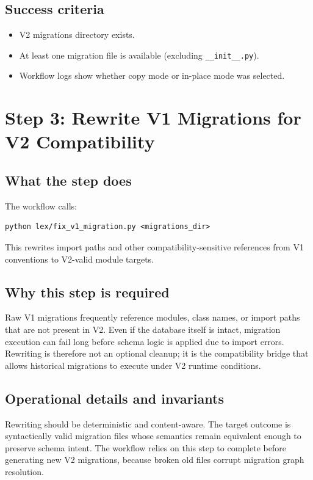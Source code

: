 \documentclass[11pt,a4paper]{article}
\begin{document}
\subsection*{Success criteria}
\begin{itemize}[leftmargin=1.5em]
  \item V2 migrations directory exists.
  \item At least one migration file is available (excluding \texttt{\_\_init\_\_.py}).
  \item Workflow logs show whether copy mode or in-place mode was selected.
\end{itemize}

\newpage
\section{Step 3: Rewrite V1 Migrations for V2 Compatibility}
\subsection*{What the step does}
The workflow calls:
\begin{verbatim}
python lex/fix_v1_migration.py <migrations_dir>
\end{verbatim}
This rewrites import paths and other compatibility-sensitive references from V1 conventions
to V2-valid module targets.

\subsection*{Why this step is required}
Raw V1 migrations frequently reference modules, class names, or import paths that are not
present in V2. Even if the database itself is intact, migration execution can fail long
before schema logic is applied due to import errors. Rewriting is therefore not an optional
cleanup; it is the compatibility bridge that allows historical migrations to execute under
V2 runtime conditions.

\subsection*{Operational details and invariants}
Rewriting should be deterministic and content-aware. The target outcome is syntactically
valid migration files whose semantics remain equivalent enough to preserve schema intent.
The workflow relies on this step to complete before generating new V2 migrations, because
broken old files corrupt migration graph resolution.
\end{document}
